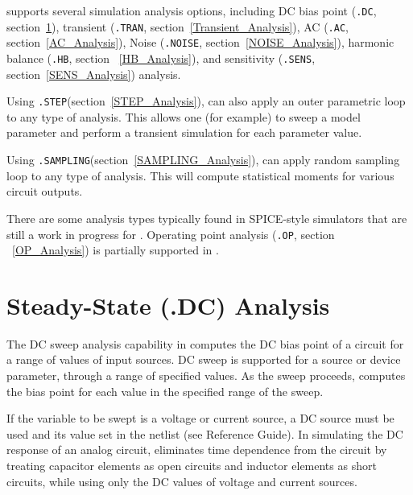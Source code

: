 \Xyce{} supports several simulation analysis options, including DC
bias point (\texttt{.DC}, section~\ref{DC_Analysis}), transient
(\texttt{.TRAN}, section~\ref{Transient_Analysis}), AC (\texttt{.AC},
section~\ref{AC_Analysis}), Noise (\texttt{.NOISE},
section~\ref{NOISE_Analysis}), harmonic balance (\texttt{.HB}, section
~\ref{HB_Analysis}), and sensitivity (\texttt{.SENS},
section~\ref{SENS_Analysis}) analysis.

Using \texttt{.STEP}(section~\ref{STEP_Analysis}), \Xyce{} can also
apply an outer parametric loop to any type of analysis. This allows
one (for example) to sweep a model parameter and perform a transient
simulation for each parameter value.

Using \texttt{.SAMPLING}(section~\ref{SAMPLING_Analysis}), \Xyce{} can
apply random sampling loop to any type of analysis.  This will compute
statistical moments for various circuit outputs.

There are some analysis types typically found in SPICE-style
simulators that are still a work in progress for \Xyce{}. Operating
point analysis (\texttt{.OP}, section ~\ref{OP_Analysis}) is partially
supported in \Xyce{}.

\section{Steady-State (.DC) Analysis}
\label{DC_Analysis}
\label{DC_Sweep_Overview}
 
 

The DC sweep analysis capability in \Xyce{} computes the DC bias point
of a circuit for a range of values of input sources.  DC sweep is
supported for a source or device parameter, through a range of
specified values.  As the sweep proceeds, \Xyce{} computes the bias
point for each value in the specified range of the
sweep.

If the variable to be swept is a voltage or current source, a DC
source must be used and its value set in the netlist (see \Xyce{}
Reference Guide\ReferenceGuide{}). In simulating the DC response of an
analog circuit, \Xyce{} eliminates time dependence from the circuit by
treating capacitor elements as open circuits and inductor elements as
short circuits, while using only the DC values of voltage and current
sources.

